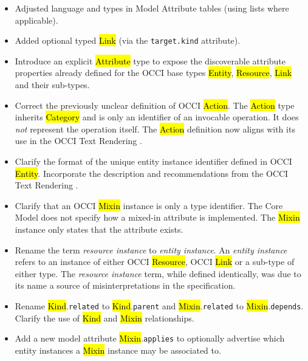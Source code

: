 \documentclass[10pt,a4paper]{article}
\begin{document}
\begin{itemize}
\item Adjusted language and types in Model Attribute tables (using lists where applicable).

\item Added optional typed \hl{Link} (via the {\tt target.kind} attribute).

\item Introduce an explicit \hl{Attribute} type to expose the discoverable
  attribute properties already defined for the OCCI base types \hl{Entity},
  \hl{Resource}, \hl{Link} and their sub-types.

\item Correct the previously unclear definition of OCCI \hl{Action}. The
  \hl{Action} type inherits \hl{Category} and is only an identifier of
  an invocable operation. It does {\em not} represent the operation itself.
  The \hl{Action} definition now aligns with its use in the OCCI Text Rendering
  \cite{occi:text}.

\item Clarify the format of the unique entity instance identifier defined in
  OCCI \hl{Entity}. Incorporate the description and recommendations from the
  OCCI Text Rendering \cite{occi:text}.

\item Clarify that an OCCI \hl{Mixin} instance is only a type identifier. The
  Core Model does not specify how a mixed-in attribute is implemented. The
  \hl{Mixin} instance only states that the attribute exists.

\item Rename the term {\em resource instance} to {\em entity instance}.
  An {\em entity instance} refers to an instance of either OCCI \hl{Resource},
  OCCI \hl{Link} or a sub-type of either type. The {\em resource instance}
  term, while defined identically, was due to its name a source of
  misinterpretations in the specification.

\item Rename \hl{Kind}.{\tt related} to \hl{Kind}.{\tt parent} and
  \hl{Mixin}.{\tt related} to \hl{Mixin}.{\tt depends}. Clarify the use
  of \hl{Kind} and \hl{Mixin} relationships.

\item Add a new model attribute \hl{Mixin}.{\tt applies} to optionally
  advertise which entity instances a \hl{Mixin} instance may be associated to.
\end{itemize}
\end{document}
